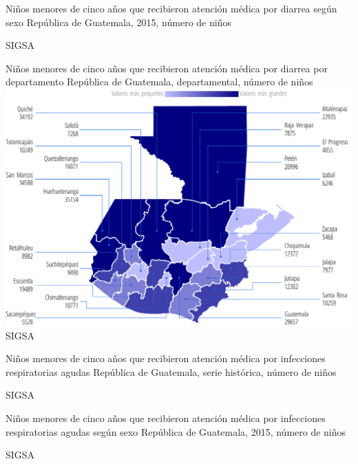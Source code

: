 
%
{%
}%
{%
	Niños menores de cinco años que recibieron atención médica por diarrea según sexo} %
{%
	República de Guatemala, 2015, número de niños} %
{%
	\begin{tikzpicture}[x=1pt,y=1pt]    \end{tikzpicture}}%
{%
	SIGSA} %


%
{%
}%
{%
	Niños menores de cinco años que recibieron atención médica por diarrea por departamento} %
{%
	República de Guatemala, departamental, número de niños} %
{%
	\includegraphics[width=52\cuadri]{graficas/5_14.pdf}}%
{%
	SIGSA} %


%
{%
}%
{%
	Niños menores de cinco años que recibieron atención médica por infecciones respiratorias agudas} %
{%
	República de Guatemala, serie histórica, número de niños} %
{%
	\begin{tikzpicture}[x=1pt,y=1pt]    \end{tikzpicture}}%
{%
	SIGSA} %


%
{%
}%
{%
	Niños menores de cinco años que recibieron atención médica por infecciones respiratorias agudas según sexo} %
{%
	República de Guatemala, 2015, número de niños} %
{%
	\begin{tikzpicture}[x=1pt,y=1pt]    \end{tikzpicture}}%
{%
	SIGSA} %

